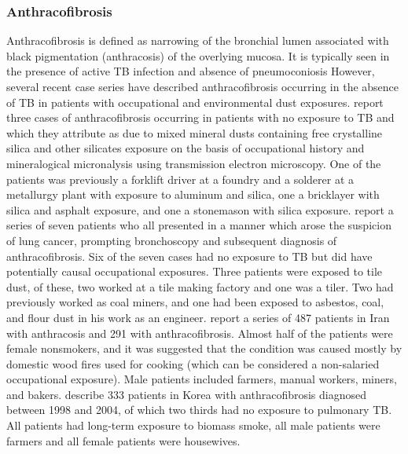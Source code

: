 \documentclass[a4paper,12pt]{article}
\begin{document}
\subsubsection{Anthracofibrosis}
Anthracofibrosis is defined as narrowing of the bronchial lumen associated with black pigmentation (anthracosis) of the overlying mucosa. It is typically seen in the presence of active TB infection and absence of pneumoconiosis  However, several recent case series have described anthracofibrosis occurring in the absence of TB in patients with occupational and environmental dust exposures. \cite{Naccache2008} report three cases of anthracofibrosis occurring in patients with no exposure to TB and which they attribute as due to mixed mineral dusts containing free crystalline silica and other silicates exposure on the basis of occupational history and mineralogical micronalysis using transmission electron microscopy. One of the patients was previously a forklift driver at a foundry and a solderer at a metallurgy plant with exposure to aluminum and silica, one a bricklayer with silica and asphalt exposure, and one a stonemason with silica exposure.
\cite{Wynn2008} report a series of seven patients who all presented in a manner which arose the suspicion of lung cancer, prompting bronchoscopy and subsequent diagnosis of anthracofibrosis. Six of the seven cases had no exposure to TB but did have potentially causal occupational exposures. Three patients were exposed to tile dust, of these, two worked at a tile making factory and one was a tiler. Two had previously worked as coal miners, and one had been exposed to asbestos, coal, and flour dust in his work as an engineer.
\cite{Sigari2009} report a series of 487 patients in Iran with anthracosis and 291 with anthracofibrosis.  Almost half of the patients were female nonsmokers, and it was suggested that the condition was caused mostly by domestic wood fires used for cooking (which can be considered a non-salaried occupational exposure). Male patients included farmers, manual workers, miners, and bakers.\cite{Kim2009} describe 333 patients in Korea with anthracofibrosis diagnosed between 1998 and 2004, of which two thirds had no exposure to pulmonary TB. All patients had long-term exposure to biomass smoke, all male patients were farmers and all female patients were housewives.
\end{document}
